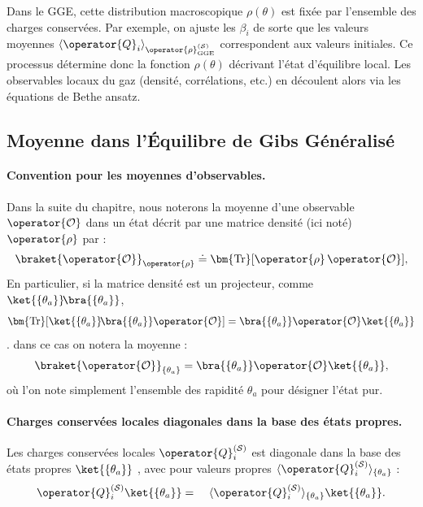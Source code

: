 Dans le \gls{GGE}, cette distribution macroscopique $\rho(\theta)$ est fixée par l’ensemble des charges conservées. Par exemple, on ajuste les $\beta_i$ de sorte que les valeurs moyennes $\langle \operator{Q}_i \rangle_{\operator{\rho}^{(\mathcal{S})}_{\mathrm{GGE}}}$ correspondent aux valeurs initiales. Ce processus détermine donc la fonction $\rho(\theta)$ décrivant l’état d’équilibre local. Les observables locaux du gaz (densité, corrélations, etc.) en découlent alors via les équations de Bethe ansatz. 


\subsection{Moyenne dans l'Équilibre de Gibs Généralisé}

\paragraph{Convention pour les moyennes d'observables.}
Dans la suite du chapitre, nous noterons la moyenne d’une observable $\operator{\mathcal{O}}$ dans un état décrit par une matrice densité (ici noté) $\operator{\rho}$ par :
\begin{eqnarray}\label{chap.TBA.moy.dens}	
	\braket{\operator{\mathcal{O}}}_{\operator{\rho}} \doteq \bm{\mathrm{Tr}}[\operator{\rho} \, \operator{\mathcal{O}}],
\end{eqnarray}
En particulier, si la matrice densité est un projecteur, comme $\ket{\{\theta_a \}}\!\bra{\{\theta_a \}}$, \[\bm{\mathrm{Tr}}[\ket{\{\theta_a \}}\!\bra{\{\theta_a \}} \operator{\mathcal{O}}] =  \bra{\{\theta_a \}}\operator{\mathcal{O}}\ket{\{\theta_a \}}\]. dans ce cas on notera la moyenne :
\begin{eqnarray}\label{chap.TBA.moy.dens.pur}
	\braket{\operator{\mathcal{O}}}_{\{\theta_a \}} = \bra{\{\theta_a \}} \operator{\mathcal{O}} \ket{\{\theta_a \}},
\end{eqnarray}
où l’on note simplement l’ensemble des rapidité ${\theta_a}$ pour désigner l’état pur.

\paragraph{Charges conservées locales diagonales dans la base des états propres.}
Les charges conservées locales $\operator{Q}_i^{(\mathcal{S})}$ est diagonale dans la base des  états propres $\ket{ \{ \theta_a \}}$ , avec pour valeurs propres $\langle \operator{Q}_i^{(\mathcal{S})} \rangle_{\{\theta_a \}} $ 	 :
\begin{eqnarray}\label{chap.TBA.Qi.diag}
	\operator{Q}_i^{(\mathcal{S})}\ket{\{\theta_a \}} & = &  \langle \operator{Q}_i^{(\mathcal{S})} \rangle_{\{\theta_a \}}  \ket{\{\theta_a \}}.		
\end{eqnarray}

